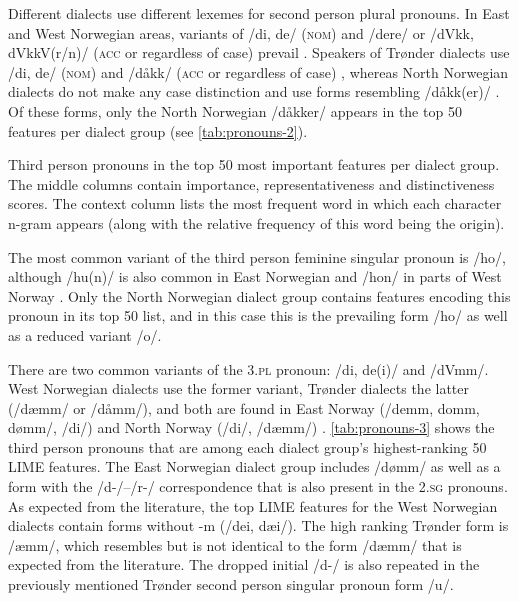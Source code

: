 Different dialects use different lexemes for second person plural pronouns.
In East and West Norwegian areas, variants of /di, de/ (\textsc{nom}) and /dere/ or /dVkk, dVkkV(r/n)/ (\textsc{acc} or regardless of case) prevail \citep[pp.~80--86]{papazian2008dedykkdere}.
Speakers of Trønder dialects use /di, de/ (\textsc{nom}) and /dåkk/ (\textsc{acc} or regardless of case) \citep[p.~86]{papazian2008dedykkdere}, whereas North Norwegian dialects do not make any case distinction and use forms resembling /dåkk(er)/ \citep[p.~87]{papazian2008dedykkdere}.
Of these forms, only the North Norwegian /d\aa{}kker/ appears in the top 50 features per dialect group (see \autoref{tab:pronouns-2}).


\begin{table}[htbp]
    
    \caption[Third person pronouns in the top 50 most important features per dialect group]
    {Third person pronouns in the top 50 most important features per dialect group.
    The middle columns contain importance, representativeness and distinctiveness scores.
    The context column lists the most frequent word in which each character n-gram appears (along with the relative frequency of this word being the origin).}
    \label{tab:pronouns-3}
\end{table}

The most common variant of the third person feminine singular pronoun is /ho/, although /hu(n)/ is also common in East Norwegian and /hon/ in parts of West Norway \citep[p.~110]{hanssen2010dialekter}.
Only the North Norwegian dialect group contains features encoding this pronoun in its top 50 list, and in this case this is the prevailing form /ho/ as well as a reduced variant /o/.

There are two common variants of the \textsc{3.pl} pronoun: /di, de(i)/ and /dVmm/.
West Norwegian dialects use the former variant, Trønder dialects the latter (/dæmm/ or /dåmm/), and both are found in East Norway (/demm, domm, dømm/, /di/) and North Norway (/di/, /dæmm/) \citep[pp.~52, 78, 91, 109]{maehlum2012dialektlandskapet}.
\autoref{tab:pronouns-3} shows the third person pronouns that are among each dialect group's highest-ranking 50 LIME features.
The East Norwegian dialect group includes /dømm/ as well as a form with the /d-/--/r-/ correspondence that is also present in the \textsc{2.sg} pronouns.
As expected from the literature, the top LIME features for the West Norwegian dialects contain forms without -m (/dei, d\ae{}i/).
The high ranking Trønder form is /\ae{}mm/, which resembles but is not identical to the form /d\ae{}mm/ that is expected from the literature.
The dropped initial /d-/ is also repeated in the previously mentioned Trønder second person singular pronoun form /u/.

